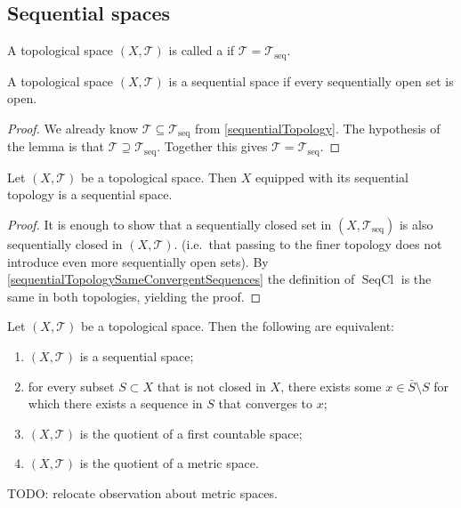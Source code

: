 \subsection{Sequential spaces}
\begin{definition}
A topological space $(X,\mathcal{T})$ is called a  if $\mathcal{T} = \mathcal{T}_\text{seq}$.
\end{definition}

\begin{lemma}
A topological space $(X,\mathcal{T})$ is a sequential space if every sequentially open set is open.
\end{lemma}
\begin{proof}
We already know $\mathcal{T} \subseteq \mathcal{T}_\text{seq}$ from \ref{sequentialTopology}. The hypothesis of the lemma is that $\mathcal{T} \supseteq \mathcal{T}_\text{seq}$. Together this gives $\mathcal{T} = \mathcal{T}_\text{seq}$.
\end{proof}

\begin{lemma}
Let $(X,\mathcal{T})$ be a topological space. Then $X$ equipped with its sequential topology is a sequential space.
\end{lemma}
\begin{proof}
It is enough to show that a sequentially closed set in $(X,\mathcal{T}_\text{seq})$ is also sequentially closed in $(X,\mathcal{T})$. (i.e.\ that passing to the finer topology does not introduce even more sequentially open sets). By \ref{sequentialTopologySameConvergentSequences} the definition of $\operatorname{SeqCl}$ is the same in both topologies, yielding the proof.
\end{proof}

\begin{proposition}
Let $(X,\mathcal{T})$ be a topological space. Then the following are equivalent:
\begin{enumerate}
\item $(X,\mathcal{T})$ is a sequential space;
\item for every subset $S\subset X$ that is not closed in $X$, there exists some $x\in \bar{S}\setminus S$ for which there exists a sequence in $S$ that converges to $x$;
\item $(X,\mathcal{T})$ is the quotient of a first countable space;
\item $(X,\mathcal{T})$ is the quotient of a metric space.
\end{enumerate}
\end{proposition}
TODO: relocate observation about metric spaces.

